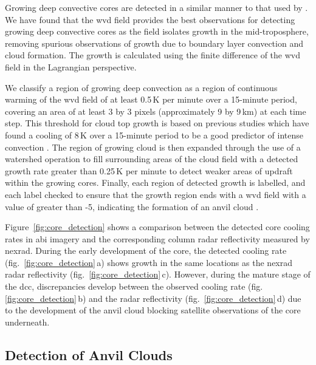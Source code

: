Growing deep convective cores are detected in a similar manner to that used by \citet{zinner_cb-tram:_2008}.
We have found that the \acrshort{wvd} field provides the best observations for detecting growing deep convective cores as the field isolates growth in the mid-troposphere, removing spurious observations of growth due to boundary layer convection and cloud formation.
The growth is calculated using the finite difference of the \acrshort{wvd} field in the Lagrangian perspective.

We classify a region of growing deep convection as a region of continuous warming of the \acrshort{wvd} field of at least 0.5\,\unit{K} per minute over a 15-minute period, covering an area of at least 3 by 3 pixels (approximately 9 by 9\,\unit{km}) at each time step.
This threshold for cloud top growth is based on previous studies which have found a cooling of 8\,\unit{K} over a 15-minute period to be a good predictor of intense convection \citep{roberts_nowcasting_2003, hartung_intercomparison_2013}.
The region of growing cloud is then expanded through the use of a watershed operation to fill surrounding areas of the cloud field with a detected growth rate greater than 0.25\,\unit{K} per minute to detect weaker areas of updraft within the growing cores.
Finally, each region of detected growth is labelled, and each label checked to ensure that the growth region ends with a \acrshort{wvd} field with a value of greater than -5, indicating the formation of an anvil cloud \citep{muller_role_2018}.

Figure~\ref{fig:core_detection} shows a comparison between the detected core cooling rates in \acrshort{abi} imagery and the corresponding column radar reflectivity measured by \acrshort{nexrad}. 
During the early development of the core, the detected cooling rate (fig.~\ref{fig:core_detection}\,a) shows growth in the same locations as the \acrshort{nexrad} radar reflectivity (fig.~\ref{fig:core_detection}\,c).
However, during the mature stage of the \acrshort{dcc}, discrepancies develop between the observed cooling rate (fig.\ref{fig:core_detection}\,b) and the radar reflectivity (fig.~\ref{fig:core_detection}\,d) due to the development of the anvil cloud blocking satellite observations of the core underneath.

\subsection{Detection of Anvil Clouds}

